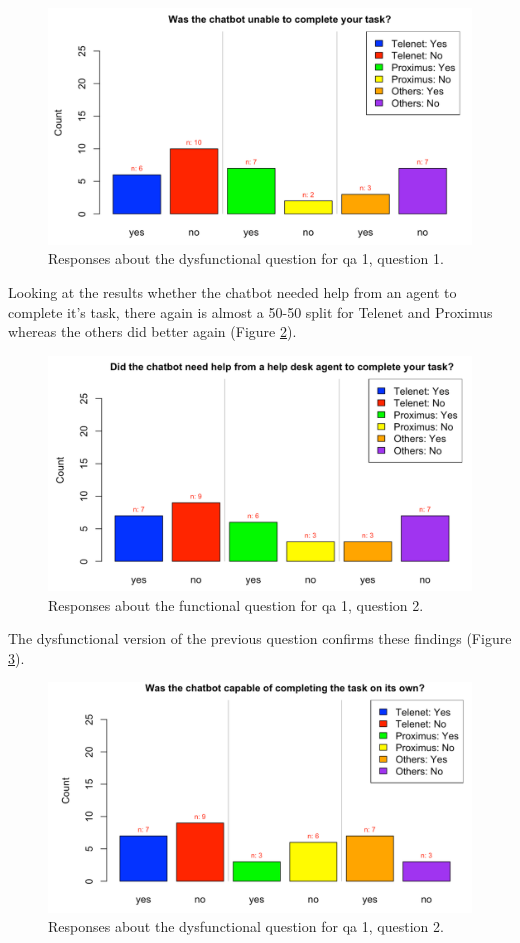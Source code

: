 \begin{figure}[!htb]
	\centering
	\includegraphics[width=375pt]{../LaTeX/Figures/Comparative/DQ1.png}
	\caption{Responses about the dysfunctional question for \acrshort{qa} 1, question 1.}\label{fig:DQ1}
\end{figure}
\break
Looking at the results whether the chatbot needed help from an agent to complete it's task, there again is almost a 50-50 split for Telenet and Proximus whereas the others did better again (Figure \ref{fig:Q1b}).\\
\begin{figure}[!htb]
	\centering
	\includegraphics[width=375pt]{../LaTeX/Figures/Comparative/Q1b.png}
	\caption{Responses about the functional question for \acrshort{qa} 1, question 2.}\label{fig:Q1b}
\end{figure}
\break
The dysfunctional version of the previous question confirms these findings (Figure \ref{fig:DQ1b}).\\
\begin{figure}[!htb]
	\centering
	\includegraphics[width=375pt]{../LaTeX/Figures/Comparative/DQ1b.png}
	\caption{Responses about the dysfunctional question for \acrshort{qa} 1, question 2.}\label{fig:DQ1b}
\end{figure}

